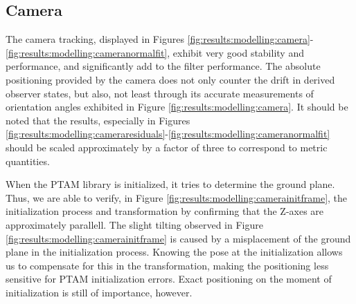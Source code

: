     \subsection{Camera}
        The camera tracking, displayed in Figures \ref{fig:results:modelling:camera}-\ref{fig:results:modelling:cameranormalfit},
        exhibit very good stability and performance, and significantly add to
        the filter performance. The absolute positioning provided by the
        camera does not only counter the drift in derived observer states,
        but also, not least through its accurate measurements of orientation
        angles exhibited in Figure \ref{fig:results:modelling:camera}.
        It should be noted that the results, especially in Figures
        \ref{fig:results:modelling:cameraresiduals}-\ref{fig:results:modelling:cameranormalfit}
        should be scaled approximately by a factor of three to correspond
        to metric quantities.

        When the PTAM library is initialized, it tries to determine the
        ground plane. Thus, we are able to verify, in Figure \ref{fig:results:modelling:camerainitframe}, the initialization process and transformation
        by confirming that the Z-axes are approximately parallell.
        The slight tilting observed in Figure \ref{fig:results:modelling:camerainitframe}
        is caused by a misplacement of the ground plane in the initialization process.
        Knowing the pose at the initialization allows us to compensate for this in the
        transformation, making the positioning less sensitive for PTAM initialization errors.
        Exact positioning on the moment of initialization is still of importance, however.


